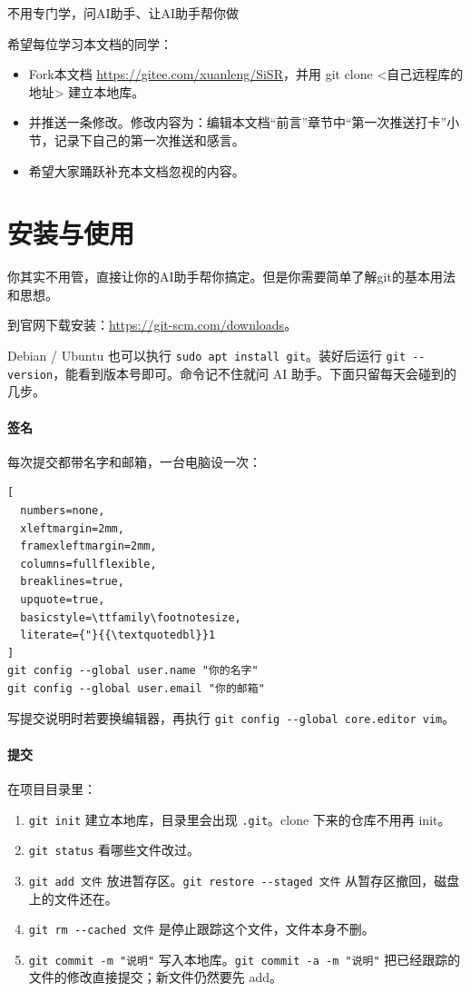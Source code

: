 \begin{xiaonao}[如何学习git]
不用专门学，问AI助手、让AI助手帮你做
\end{xiaonao}

希望每位学习本文档的同学：
\begin{itemize}
\item Fork本文档 \url{https://gitee.com/xuanleng/SiSR}，并用 git clone <自己远程库的地址> 建立本地库。
\item 并推送一条修改。修改内容为：编辑本文档“前言”章节中“第一次推送打卡”小节，记录下自己的第一次推送和感言。
\item 希望大家踊跃补充本文档忽视的内容。
\end{itemize}




\section{安装与使用}
\begin{xiaonao}[如何安装使用git]
你其实不用管，直接让你的AI助手帮你搞定。但是你需要简单了解git的基本用法和思想。
\end{xiaonao}

到官网下载安装：\url{https://git-scm.com/downloads}。

Debian / Ubuntu 也可以执行 \verb|sudo apt install git|。装好后运行 \verb|git --version|，能看到版本号即可。命令记不住就问 AI 助手。下面只留每天会碰到的几步。

\paragraph{签名}
每次提交都带名字和邮箱，一台电脑设一次：
\begin{lstlisting}[
  numbers=none,
  xleftmargin=2mm,
  framexleftmargin=2mm,
  columns=fullflexible,
  breaklines=true,
  upquote=true,
  basicstyle=\ttfamily\footnotesize,
  literate={"}{{\textquotedbl}}1
]
git config --global user.name "你的名字"
git config --global user.email "你的邮箱"
\end{lstlisting}
写提交说明时若要换编辑器，再执行 \verb|git config --global core.editor vim|。

\paragraph{提交}
在项目目录里：
\begin{enumerate}
\item \verb|git init| 建立本地库，目录里会出现 \verb|.git|。clone 下来的仓库不用再 init。
\item \verb|git status| 看哪些文件改过。
\item \verb|git add 文件| 放进暂存区。\verb|git restore --staged 文件| 从暂存区撤回，磁盘上的文件还在。
\item \verb|git rm --cached 文件| 是停止跟踪这个文件，文件本身不删。
\item \verb|git commit -m "说明"| 写入本地库。\verb|git commit -a -m "说明"| 把已经跟踪的文件的修改直接提交；新文件仍然要先 add。
\end{enumerate}

